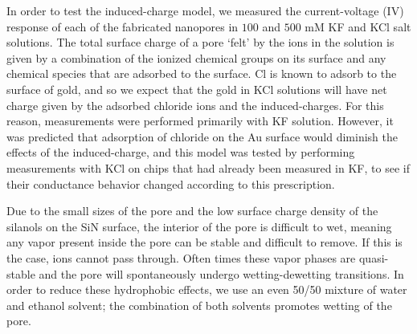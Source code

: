 		
			In order to test the induced-charge model, we measured the current-voltage (IV) response of each of the fabricated nanopores in $100$ and $500$ mM KF and KCl salt solutions. The total surface charge of a pore `felt' by the ions in the solution is given by a combination of the ionized chemical groups on its surface and any chemical species that are adsorbed to the surface. Cl is known to adsorb to the surface of gold, and so we expect that the gold in KCl solutions will have net charge given by the adsorbed chloride ions and the induced-charges. For this reason, measurements were performed primarily with KF solution. However, it was predicted that adsorption of chloride on the Au surface would diminish the effects of the induced-charge, and this model was tested by performing measurements with KCl on chips that had already been measured in KF, to see if their conductance behavior changed according to this prescription. 
			
			Due to the small sizes of the pore and the low surface charge density of the silanols on the SiN surface, the interior of the pore is difficult to wet, meaning any vapor present inside the pore can be stable and difficult to remove. If this is the case, ions cannot pass through. Often times these vapor phases are quasi-stable and the pore will spontaneously undergo wetting-dewetting transitions. In order to reduce these hydrophobic effects, we use an even 50/50 mixture of water and ethanol solvent; the combination of both solvents promotes wetting of the pore. 
			
